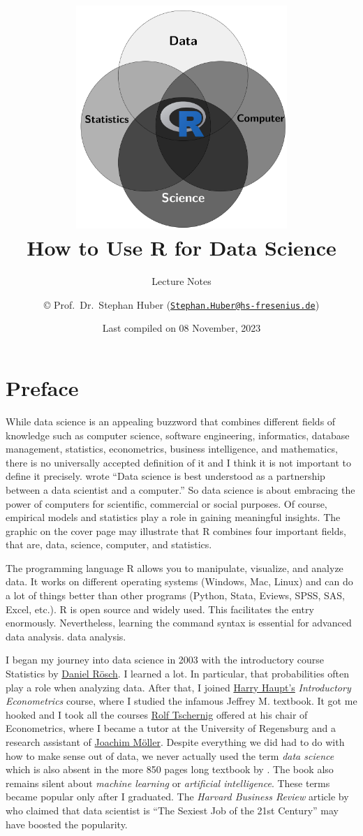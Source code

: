 \documentclass[
  12pt,
  oneside]{book}
\title{\includegraphics[width=8cm,height=\textheight]{fig/cover.png}\\
How to Use R for Data Science}
\subtitle{Lecture Notes}
\author{© Prof.~Dr.~Stephan Huber (\href{mailto:Stephan.Huber@hs-fresenius.de}{\nolinkurl{Stephan.Huber@hs-fresenius.de}})}
\date{Last compiled on 08 November, 2023}
\theoremstyle{definition}
\theoremstyle{definition}
\theoremstyle{definition}
\theoremstyle{definition}
\theoremstyle{remark}
\begin{document}
\maketitle

{
\hypersetup{linkcolor=}
\setcounter{tocdepth}{2}
\tableofcontents
}
\hypertarget{preface}{%
\chapter*{Preface}\label{preface}}

While data science is an appealing buzzword that combines different fields of knowledge such as computer science, software engineering, informatics, database management, statistics, econometrics, business intelligence, and mathematics, there is no universally accepted definition of it and I think it is not important to define it precisely. \citet[p.~97]{Kelleher2018Data} wrote ``Data science is best understood as a partnership between a data scientist and a computer.'' So data science is about embracing the power of computers for scientific, commercial or social purposes. Of course, empirical models and statistics play a role in gaining meaningful insights. The graphic on the cover page may illustrate that R combines four important fields, that are, data, science, computer, and statistics.

The programming language R allows you to manipulate, visualize, and analyze data. It works on different operating systems (Windows, Mac, Linux) and can do a lot of things better than other programs (Python, Stata, Eviews, SPSS, SAS, Excel, etc.). R is open source and widely used. This facilitates the
entry enormously. Nevertheless, learning the command syntax is essential for advanced data analysis.
data analysis.

I began my journey into data science in 2003 with the introductory course Statistics by \href{https://scholar.google.com/citations?user=geLs3JUAAAAJ\&hl=en}{Daniel Rösch}. I learned a lot. In particular, that probabilities often play a role when analyzing data. After that, I joined \href{https://scholar.google.ca/citations?user=tHNB7wIAAAAJ\&hl=en}{Harry Haupt's} \emph{Introductory Econometrics} course, where I studied the infamous Jeffrey M. \citet{Wooldridge2002Introductory} textbook. It got me hooked and I took all the courses \href{https://www.uni-regensburg.de/business-economics-and-management-information-systems/economics-tschernig/team/rolf-tschernig/index.html}{Rolf Tschernig} offered at his chair of Econometrics, where I became a tutor at the University of Regensburg and a research assistant of \href{https://iab.de/en/employee/m\%C3\%B6ller-joachim/}{Joachim Möller}. Despite everything we did had to do with how to make sense out of data, we never actually used the term \emph{data science} which is also absent in the more 850 pages long textbook by \citet{Wooldridge2002Introductory}. The book also remains silent about \emph{machine learning} or \emph{artificial intelligence}. These terms became popular only after I graduated. The \emph{Harvard Business Review} article by \citet{Davenport2012Data} who claimed that data scientist is ``The Sexiest Job of the 21st Century'' may have boosted the popularity.
\end{document}
